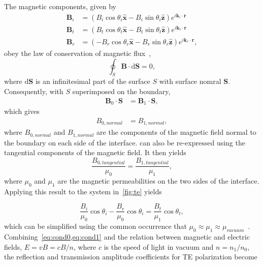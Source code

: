 \documentclass[10pt,twoside, b5paper,pdftex]{report}
\begin{document}
The magnetic components, given by 
\begin{subequations}
\begin{align}
\mathbf{B}_{i} &= \left(B_{i}\cos{\theta_{i}} \widehat{ {\mathbf x}} - B_{i}\sin{\theta_{i}} \widehat{ {\mathbf z}}\right) e^{i\mathbf{k}_{i}\cdot\mathbf{r}} \label{eq:Bi} \\
\mathbf{B}_{t} &= \left(B_{t}\cos{\theta_{t}} \widehat{ {\mathbf x}} - B_{t}\sin{\theta_{t}} \widehat{ {\mathbf z}}\right) e^{i\mathbf{k}_{t}\cdot\mathbf{r}} \label{eq:Bt} \\ 
\mathbf{B}_{r} &= \left(-B_{r}\cos{\theta_{r}} \widehat{ {\mathbf x}} - B_{r}\sin{\theta_{r}} \widehat{ {\mathbf z}}\right) e^{i\mathbf{k}_{r}\cdot\mathbf{r}} \label{eq:Br},
\end{align}
\end{subequations}
%
obey the law of conservation of magnetic flux~\cite{POPOVIC},
\begin{equation}\label{eq:maxwell_2}
\oint_{S} \mathbf{B} \cdot \mbox{d}\mathbf{S} = 0,
\end{equation}
%
where $\mbox{d}\mathbf{S}$ is an infinitesimal part of the surface $S$ with surface nomral $\mathbf{S}$. Consequently, with $S$ superimposed on the boundary,
%
\begin{align}
\mathbf{B}_{0}\cdot\mathbf{S} &= \mathbf{B}_{1}\cdot\mathbf{S} ,
\end{align}
which gives
\begin{align}
B_{0, normal} &= B_{1, normal} \label{eq:bound_cond_2},
\end{align}
where $B_{0, normal}$ and $B_{1, normal}$ are the components of the magnetic field normal to the boundary on each side of the interface.  can also be re-expressed using the tangential components of the magnetic field. It then yields
\begin{equation}\label{eq:bound_cond_3}
\frac{B_{0, tangential}}{\mu_{0}} = \frac{B_{1, tangential}}{\mu_{1}},
\end{equation} 
where $\mu_{0}$ and $\mu_{1}$ are the magnetic permeabilities on the two sides of the interface.
%
Applying this result to the system in~\cref{fig:te} yields

\begin{equation}\label{eq:cond1}
\frac{B_{i}}{\mu_{0}}\cos{\theta_{i}} - \frac{B_{r}}{\mu_{0}}\cos{\theta_{i}} = \frac{B_{t}}{\mu_{1}}\cos{\theta_{t}},
\end{equation}
%
which can be simplified using the common occurrence that $\mu_{0} \approx \mu_{1} \approx \mu_{vacuum}$~\cite{GRIFF}. Combining~\cref{eq:cond0,eq:cond1} and the relation between magnetic and electric fields, $E = vB = cB/n$, where $c$ is the speed of light in vacuum and $n = n_{1}/n_{0}$, the reflection and transmission amplitude coefficients for TE polarization become
\end{document}
